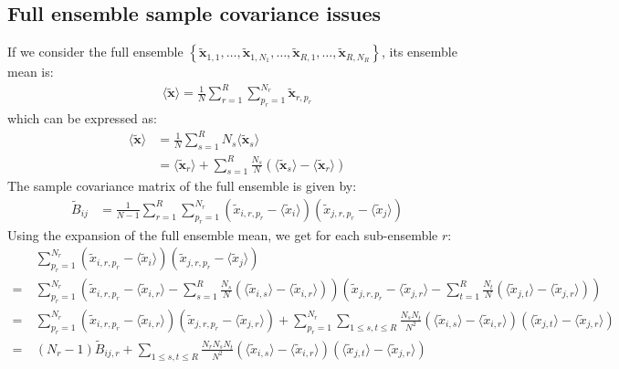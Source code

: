 \documentclass[12pt]{scrartcl}
\begin{document}
\subsection{Full ensemble sample covariance issues}
If we consider the full ensemble $\left\{\widetilde{\mathbf{x}}_{1,1},\dots,\widetilde{\mathbf{x}}_{1,N_1},\dots, \widetilde{\mathbf{x}}_{R,1},\dots,\widetilde{\mathbf{x}}_{R,N_R}\right\}$, its ensemble mean is:
\begin{align}
\langle \widetilde{\mathbf{x}} \rangle = \frac{1}{N} \sum_{r=1}^R \sum_{p_r=1}^{N_r} \widetilde{\mathbf{x}}_{r,p_r}
\end{align}
which can be expressed as:
\begin{align}
\langle \widetilde{\mathbf{x}} \rangle & = \frac{1}{N} \sum_{s=1}^R N_s \langle \widetilde{\mathbf{x}}_s \rangle \nonumber \\
 & = \langle \widetilde{\mathbf{x}}_r \rangle + \sum_{s=1}^R \frac{N_s}{N} \left(\langle \widetilde{\mathbf{x}}_s \rangle - \langle \widetilde{\mathbf{x}}_r \rangle \right)
\end{align}
The sample covariance matrix of the full ensemble is given by:
\begin{align}
\label{eq:cov_estim_full}
\widetilde{B}_{ij} & = \frac{1}{N-1} \sum_{r=1}^R \sum_{p_r=1}^{N_r} \left(\widetilde{x}_{i,r,p_r} - \langle \widetilde{x}_{i} \rangle\right) \left(\widetilde{x}_{j,r,p_r} - \langle \widetilde{x}_{j} \rangle\right)
\end{align}
Using the expansion of the full ensemble mean, we get for each sub-ensemble $r$:
\begin{align}
& \sum_{p_r=1}^{N_r} \left(\widetilde{x}_{i,r,p_r} - \langle \widetilde{x}_{i} \rangle\right) \left(\widetilde{x}_{j,r,p_r} - \langle \widetilde{x}_{j} \rangle\right) \nonumber \\
= \ & \sum_{p_r=1}^{N_r} \left(\widetilde{x}_{i,r,p_r} - \langle \widetilde{x}_{i,r} \rangle - \sum_{s=1}^R \frac{N_s}{N} \left(\langle \widetilde{x}_{i,s} \rangle - \langle \widetilde{x}_{i,r} \rangle \right) \right)  \left(\widetilde{x}_{j,r,p_r} - \langle \widetilde{x}_{j,r} \rangle - \sum_{t=1}^R \frac{N_t}{N} \left(\langle \widetilde{x}_{j,t} \rangle - \langle \widetilde{x}_{j,r} \rangle \right) \right) \nonumber \\
= \ & \sum_{p_r=1}^{N_r} \left(\widetilde{x}_{i,r,p_r} - \langle \widetilde{x}_{i,r} \rangle \right) \left(\widetilde{x}_{j,r,p_r} - \langle \widetilde{x}_{j,r} \rangle \right) + \sum_{p_r=1}^{N_r} \sum_{1 \le s,t \le R} \frac{N_s N_t}{N^2} \left(\langle \widetilde{x}_{i,s} \rangle - \langle \widetilde{x}_{i,r} \rangle \right) \left(\langle \widetilde{x}_{j,t} \rangle - \langle \widetilde{x}_{j,r} \rangle \right) \nonumber \\
= \ & \left(N_r-1\right) \widetilde{B}_{ij,r} + \sum_{1 \le s,t \le R} \frac{N_r N_s N_t}{N^2} \left(\langle \widetilde{x}_{i,s} \rangle - \langle \widetilde{x}_{i,r} \rangle \right) \left(\langle \widetilde{x}_{j,t} \rangle - \langle \widetilde{x}_{j,r} \rangle \right)
\end{align}
\end{document}
